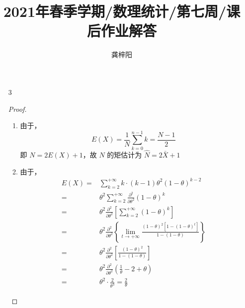 \documentclass[normal,founder,mtpro2,cn]{elegantnote}
\title{2021年春季学期/数理统计/第七周/课后作业解答}
\author{龚梓阳}
\date{\zhtoday}
\begin{document}
\maketitle
\begin{enumerate}
    \item[3]
        \begin{proof}
            \begin{enumerate}
                \item
                      由于，
                      \begin{equation*}
                          E(X)=\frac{1}{N}\sum_{k=0}^{n-1}k=\frac{N-1}{2}
                      \end{equation*}
                      即 $N=2E(X)+1$，故 $N$ 的矩估计为 $\hat{N}=2\bar{X}+1$
                \item
                      由于，
                      \begin{equation*}
                          \begin{aligned}
                              E(X)= & \sum_{k=2}^{+\infty}k\cdot(k-1)\theta^{2}(1-\theta)^{k-2}                                                                                                             \\
                              =     & \theta^{2}\sum_{k=2}^{+\infty} \frac{\partial^{2}}{\partial\theta^{2}}(1-\theta)^{k}                                                                                  \\
                              =     & \theta^{2}\frac{\partial^{2}}{\partial\theta^{2}}\left[\sum_{k=2}^{+\infty}(1-\theta)^{k}\right]                                                                      \\
                              =     & \theta^{2}\frac{\partial^{2}}{\partial\theta^{2}}\left\{\lim_{t\rightarrow+\infty}\frac{(1-\theta)^{2}\left[1-\left(1-\theta\right)^{t}\right]}{1-(1-\theta)}\right\} \\
                              =     & \theta^{2}\frac{\partial^{2}}{\partial\theta^{2}}\left[\frac{(1-\theta)^{2}}{1-(1-\theta)}\right]                                                                     \\
                              =     & \theta^{2}\frac{\partial^{2}}{\partial\theta^{2}}\left(\frac{1}{\theta}-2+\theta\right)                                                                               \\
                              =     & \theta^{2}\cdot\frac{2}{\theta^{3}}=\frac{2}{\theta}

\end{aligned}
\end{equation*}
\end{enumerate}
\end{proof}
\end{enumerate}
\end{document}

